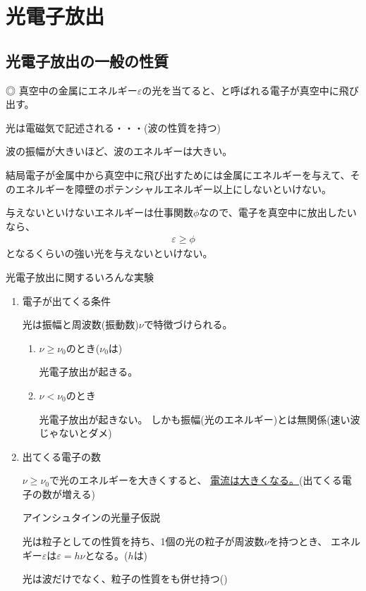 \documentclass[12pt]{ltjsarticle}
\begin{document}
\section{光電子放出}
\subsection{光電子放出の一般の性質}
◎
真空中の金属にエネルギー$\varepsilon$の光を当てると、と呼ばれる電子が真空中に飛び出す。

光は電磁気で記述される・・・(波の性質を持つ)

波の振幅が大きいほど、波のエネルギーは大きい。

結局電子が金属中から真空中に飛び出すためには金属にエネルギーを与えて、そのエネルギーを障壁のポテンシャルエネルギー以上にしないといけない。

与えないといけないエネルギーは仕事関数$\phi$なので、電子を真空中に放出したいなら、
\begin{align*}
\varepsilon \ge \phi
\end{align*}
となるくらいの強い光を与えないといけない。


\begin{itembox}[l]{光電子放出に関するいろんな実験}
\begin{enumerate}
\item 電子が出てくる条件

光は振幅と周波数(振動数)$\nu$で特徴づけられる。
\begin{enumerate}
\item $\nu\ge\nu_0$のとき($\nu_0$は)

光電子放出が起きる。

\item $\nu<\nu_0$のとき

光電子放出が起きない。
しかも振幅(光のエネルギー)とは無関係(速い波じゃないとダメ)
\end{enumerate}

\item 出てくる電子の数

$\nu\ge\nu_0$で光のエネルギーを大きくすると、
\underline{電流は大きくなる。}(出てくる電子の数が増える)
\begin{itembox}[l]{アインシュタインの光量子仮説}

光は粒子としての性質を持ち、1個の光の粒子が周波数$\nu$を持つとき、
エネルギー$\varepsilon$は$\varepsilon=h\nu$となる。($h$は)
\end{itembox}
光は波だけでなく、粒子の性質をも併せ持つ()

\end{enumerate}
\end{itembox}
\end{document}
